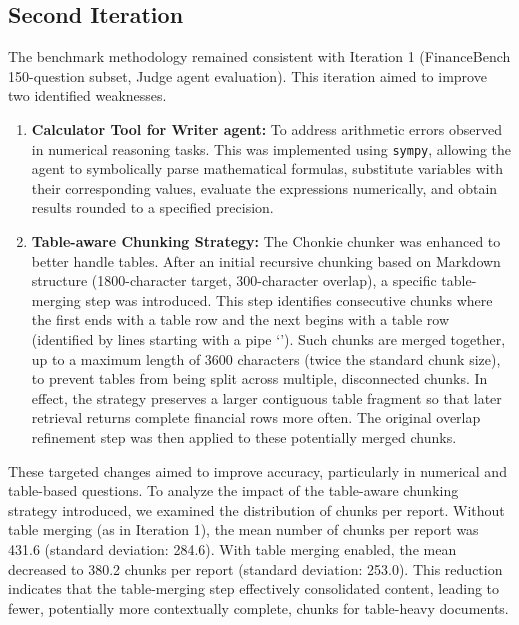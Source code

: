 \documentclass[final,5p,times,twopage,twocolumn,a4paper]{elsarticle}
\begin{document}
\subsection{Second Iteration}
\label{sec:iter2}
The benchmark methodology remained consistent with Iteration 1 (FinanceBench 150-question subset, Judge agent evaluation). This iteration aimed to improve two identified weaknesses.

\begin{enumerate}
    \item \textbf{Calculator Tool for Writer agent:} To address arithmetic errors observed in numerical reasoning tasks. This was implemented using \texttt{sympy}, allowing the agent to symbolically parse mathematical formulas, substitute variables with their corresponding values, evaluate the expressions numerically, and obtain results rounded to a specified precision.
    \item \textbf{Table-aware Chunking Strategy:} The Chonkie chunker was enhanced to better handle tables. After an initial recursive chunking based on Markdown structure (1800-character target, 300-character overlap), a specific table-merging step was introduced. This step identifies consecutive chunks where the first ends with a table row and the next begins with a table row (identified by lines starting with a pipe `\textbar'). Such chunks are merged together, up to a maximum length of 3600 characters (twice the standard chunk size), to prevent tables from being split across multiple, disconnected chunks. In effect, the strategy preserves a larger contiguous table fragment so that later retrieval returns complete financial rows more often. The original overlap refinement step was then applied to these potentially merged chunks.
\end{enumerate}

These targeted changes aimed to improve accuracy, particularly in numerical and table-based questions. To analyze the impact of the table-aware chunking strategy introduced, we examined the distribution of chunks per report. Without table merging (as in Iteration 1), the mean number of chunks per report was 431.6 (standard deviation: 284.6). With table merging enabled, the mean decreased to 380.2 chunks per report (standard deviation: 253.0). This reduction indicates that the table-merging step effectively consolidated content, leading to fewer, potentially more contextually complete, chunks for table-heavy documents.
\end{document}
